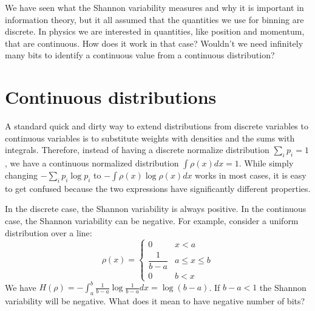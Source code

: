 \documentclass{article}
\begin{document}



We have seen what the Shannon variability measures and why it is important in information theory, but it all assumed that the quantities we use for binning are discrete. In physics we are interested in quantities, like position and momentum, that are continuous. How does it work in that case? Wouldn't we need infinitely many bits to identify a continuous value from a continuous distribution?

\section{Continuous distributions}

A standard quick and dirty way to extend distributions from discrete variables to continuous variables is to substitute weights with densities and the sums with integrals. Therefore, instead of having a discrete normalize distribution $\sum_i p_i = 1$, we have a continuous normalized distribution $\int \rho(x)dx=1$. While simply changing $- \sum_i p_i \log p_i$ to $- \int \rho(x) \log \rho(x) dx$ works in most cases, it is easy to get confused because the two expressions have significantly different properties.

In the discrete case, the Shannon variability is always positive. In the continuous case, the Shannon variability can be negative. For example, consider a uniform distribution over a line:
\begin{equation}
\rho(x)=
\begin{cases}
0 & x < a\\
\dfrac{1}{b-a} & a \leq x \leq b\\
0 & b < x
\end{cases}
\end{equation}
We have $H(\rho) = - \int_a^b \frac{1}{b-a} \log \frac{1}{b-a} dx = \log (b-a)$. If $b-a < 1$ the Shannon variability will be negative. What does it mean to have negative number of bits?
\end{document}
